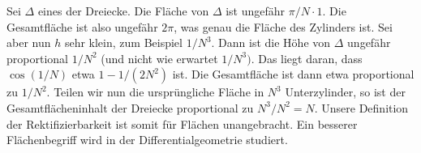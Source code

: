 \documentclass[../main.tex]{subfiles}
\begin{document}
\begin{example}
  Sei $\Delta$ eines der Dreiecke.
  Die Fläche von $\Delta$ ist ungefähr
  $\pi / N \cdot 1$.
  Die Gesamtfläche ist also ungefähr $2 \pi$,
  was genau die Fläche des Zylinders ist.
  Sei aber nun $h$ sehr klein,
  zum Beispiel $1/N^3$.
  Dann ist die Höhe von $\Delta$ ungefähr
  proportional $1/N^2$ (und nicht
  wie erwartet $1/N^3)$.
  Das liegt daran, dass
  $\cos (1/N)$ etwa  $1 - 1/(2N^2)$ ist.
  Die Gesamtfläche ist dann etwa
  proportional zu
  $1/N^2$.
  Teilen wir nun die ursprüngliche Fläche
  in $N^3$ Unterzylinder,
  so ist der Gesamtflächeninhalt
  der Dreiecke
  proportional zu $N^3/N^2 = N$.
  Unsere Definition der Rektifizierbarkeit ist
  somit für Flächen unangebracht. Ein besserer
  Flächenbegriff wird in der Differentialgeometrie studiert.
\end{example}
\end{document}
